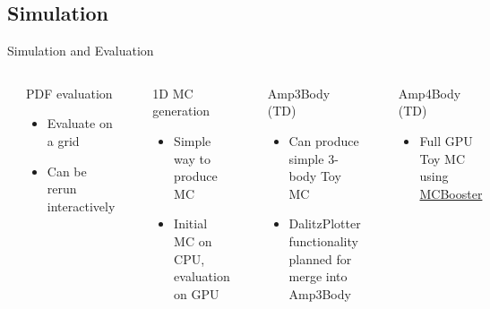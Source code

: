 \documentclass[aspectratio=169, smaller]{beamer}
\begin{document}
\subsection{Simulation}
\begin{frame}[fragile]{Simulation and Evaluation}
    \begin{columns}[c]
        \begin{lstlisting}[language=Python]
grid, pts = gauss.evaluatePdf(x)
gauss.setData(grid)
        \end{lstlisting}
        \begin{block}{PDF evaluation}
            \begin{itemize}
                \item Evaluate on a grid
                \item Can be rerun interactively
            \end{itemize}
        \end{block}

        \begin{lstlisting}[language=Python]
gauss.fillMCDataSimple(1000000)
        \end{lstlisting}
        \begin{block}{1D MC generation}
            \begin{itemize}
                \item Simple way to produce MC
                \item Initial MC on CPU, evaluation on GPU
            \end{itemize}
        \end{block}
        \begin{lstlisting}[language=Python]
dplt = DalitzPlotter(prod, dp)
arr = dplt.make2D()        
        \end{lstlisting}
        \begin{block}{Amp3Body (TD)}
            \begin{itemize}
                \item Can produce simple 3-body Toy MC
                \item DalitzPlotter functionality planned for merge into Amp3Body
            \end{itemize}
        \end{block}

        \begin{lstlisting}[language=Python]
aa.setGenerationOffset(0);
aa.GenerateSig(1000000);
        \end{lstlisting}
        \begin{block}{Amp4Body (TD)}
            \begin{itemize}
                \item Full GPU Toy MC using \href{https://github.com/GooFit/MCBooster}{MCBooster}
            \end{itemize}
        \end{block}
    \end{columns}
\end{frame}
\end{document}
